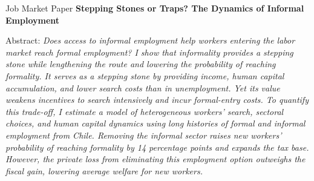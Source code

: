 \documentclass{resume} %
\begin{document}
	\pagebreak
	\begin{rSection}{Job Market Paper}
			\textbf{Stepping Stones or Traps? The Dynamics of Informal Employment}

			Abstract: \textit{Does access to informal employment help workers entering the labor market reach formal employment? I show that informality provides a stepping stone while lengthening the route and lowering the probability of reaching formality. It serves as a stepping stone by providing income, human capital accumulation, and lower search costs than in unemployment. Yet its value weakens incentives to search intensively and incur formal-entry costs. To quantify this trade-off, I estimate a model of heterogeneous workers’ search, sectoral choices, and human capital dynamics using long histories of formal and informal employment from Chile. Removing the informal sector raises new workers’ probability of reaching formality by 14 percentage points and expands the tax base. However, the private loss from eliminating this employment option outweighs the fiscal gain, lowering average welfare for new workers.}
	\end{rSection}

\end{document}
